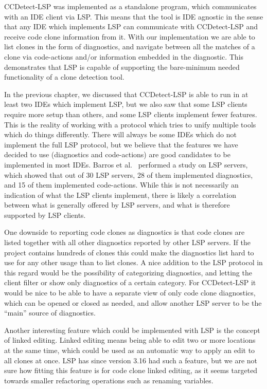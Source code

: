CCDetect-LSP was implemented as a standalone program, which communicates with an IDE
client via LSP. This means that the tool is IDE agnostic in the sense that any IDE which
implements LSP can communicate with CCDetect-LSP and receive code clone information from
it. With our implementation we are able to list clones in the form of diagnostics, and
navigate between all the matches of a clone via code-actions and/or information embedded
in the diagnostic. This demonstrates that LSP is capable of supporting the bare-minimum
needed functionality of a clone detection tool.

In the previous chapter, we discussed that CCDetect-LSP is able to run in at least two
IDEs which implement LSP, but we also saw that some LSP clients require more setup than
others, and some LSP clients implement fewer features. This is the reality of working with
a protocol which tries to unify multiple tools which do things differently. There will
always be some IDEs which do not implement the full LSP protocol, but we believe that the
features we have decided to use (diagnostics and code-actions) are good candidates to be
implemented in most IDEs. Barros et al.~\cite{LSPPractices} performed a study on LSP
servers, which showed that out of 30 LSP servers, 28 of them implemented diagnostics, and
15 of them implemented code-actions. While this is not necessarily an indication of what
the LSP clients implement, there is likely a correlation between what is generally offered
by LSP servers, and what is therefore supported by LSP clients.

One downside to reporting code clones as diagnostics is that code clones are listed
together with all other diagnostics reported by other LSP servers. If the project contains
hundreds of clones this could make the diagnostics list hard to use for any other usage
than to list clones. A nice addition to the LSP protocol in this regard would be the
possibility of categorizing diagnostics, and letting the client filter or show only
diagnostics of a certain category. For CCDetect-LSP it would be nice to be able to have a
separate view of only code clone diagnostics, which can be opened or closed as needed, and
allow another LSP server to be the ``main'' source of diagnostics.

Another interesting feature which could be implemented with LSP is the concept of linked
editing. Linked editing means being able to edit two or more locations at the same time,
which could be used as an automatic way to apply an edit to all clones at once. LSP has
since version 3.16 had such a feature, but we are not sure how fitting this feature is for
code clone linked editing, as it seems targeted towards smaller refactoring operations
such as renaming variables.

